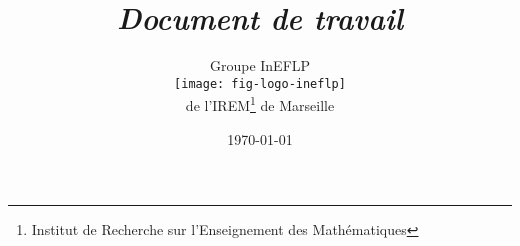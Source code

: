 \documentclass[10pt]{article}
\title{%
    \textit{Document de travail}}
\author{%
    Groupe InEFLP\\
    \texttt{[image: fig-logo-ineflp]}\\
    de l'IREM\footnote{Institut de Recherche sur l'Enseignement des Mathématiques} de Marseille
    }
\date{\today}
\begin{document}
\newpage\nopagecolor
\end{document}
